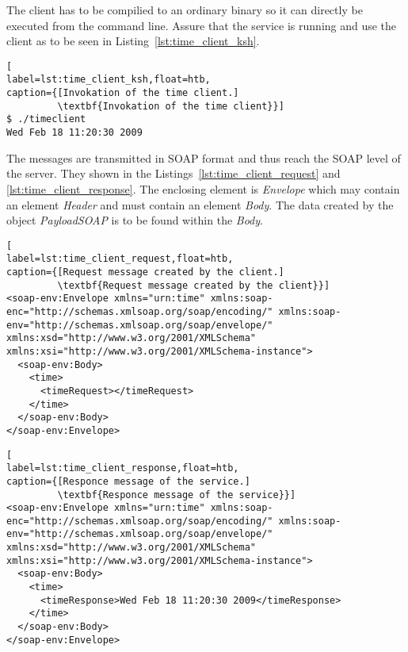 The client has to be compilied to an ordinary binary so it can directly be executed from the command line.
Assure that the service is running and use the client as to be seen in Listing~\ref{lst:time_client_ksh}.
\begin{lstlisting}[
label=lst:time_client_ksh,float=htb,
caption={[Invokation of the time client.]
         \textbf{Invokation of the time client}}]
$ ./timeclient
Wed Feb 18 11:20:30 2009
\end{lstlisting}
The messages are transmitted in SOAP format and thus reach the SOAP level of the server. They shown in the Listings~\ref{lst:time_client_request} and \ref{lst:time_client_response}.
The enclosing element is \textit{Envelope} which may contain an element \textit{Header} and must contain an element \textit{Body}. %
The data created by the object \textit{PayloadSOAP} is to be found within the \textit{Body}.
\begin{lstlisting}[
label=lst:time_client_request,float=htb,
caption={[Request message created by the client.]
         \textbf{Request message created by the client}}]
<soap-env:Envelope xmlns="urn:time" xmlns:soap-enc="http://schemas.xmlsoap.org/soap/encoding/" xmlns:soap-env="http://schemas.xmlsoap.org/soap/envelope/" xmlns:xsd="http://www.w3.org/2001/XMLSchema" xmlns:xsi="http://www.w3.org/2001/XMLSchema-instance">
  <soap-env:Body>
    <time>
      <timeRequest></timeRequest>
    </time>
  </soap-env:Body>
</soap-env:Envelope>
\end{lstlisting}


\begin{lstlisting}[
label=lst:time_client_response,float=htb,
caption={[Responce message of the service.]
         \textbf{Responce message of the service}}]
<soap-env:Envelope xmlns="urn:time" xmlns:soap-enc="http://schemas.xmlsoap.org/soap/encoding/" xmlns:soap-env="http://schemas.xmlsoap.org/soap/envelope/" xmlns:xsd="http://www.w3.org/2001/XMLSchema" xmlns:xsi="http://www.w3.org/2001/XMLSchema-instance">
  <soap-env:Body>
    <time>
      <timeResponse>Wed Feb 18 11:20:30 2009</timeResponse>
    </time>
  </soap-env:Body>
</soap-env:Envelope>
\end{lstlisting}


















